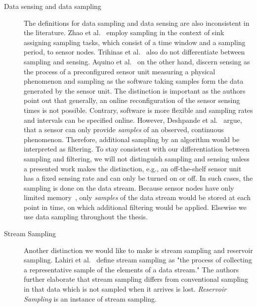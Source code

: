 \begin{description}
    \item[Data sensing and data sampling] 
        The definitions for data sampling and data sensing are also inconsistent
        in the literature. Zhao et al.~\cite{zhao2016cats} employ sampling in
        the context of sink assigning sampling tasks, which consist of a time
        window and a sampling period, to sensor nodes. Trihinas et
        al.~\cite{trihinas2015adam} also do not differentiate between sampling
        and sensing.  Aquino et al.~\cite{aquino2014musa} on the other hand,
        discern sensing as the process of a preconfigured sensor unit measuring
        a physical phenomenon and sampling as the software taking samples form
        the data generated by the sensor unit. The distinction is important as
        the authors point out that generally, an online reconfiguration of the
        sensor sensing times is not possible. Contrary, software is more
        flexible and sampling rates and intervals can be specified online.
        However, Deshpande et al.~\cite{deshpande2004model} argue, that a
        sensor can only provide \textit{samples} of an observed, continuous
        phenomenon. Therefore, additional sampling by an algorithm would be
        interpreted as filtering. To stay consistent with our differentiation
        between sampling and filtering, we will not distinguish sampling and
        sensing unless a presented work makes the distinction, e.g., an
        off-the-shelf sensor unit has a fixed sensing rate and can only be
        turned on or off. In such cases, the sampling is done on the data
        stream. Because sensor nodes have only limited
        memory~\cite{akyildiz2002wireless}, only \textit{samples} of the data
        stream would be stored at each point in time, on which additional
        filtering would be applied. Elsewise we use data sampling throughout
        the thesis.

    \item[Stream Sampling]
        Another distinction we would like to make is stream sampling and
        reservoir sampling. Lahiri et al.~\cite{Lahiri2009} define stream
        sampling as "the process of collecting a representative sample of the
        elements of a data stream." The authors further elaborate that stream
        sampling differs from conventional sampling in that data which is not
        sampled when it arrives is lost. \textit{Reservoir Sampling} is an
        instance of stream sampling. 



\end{description}
\par


